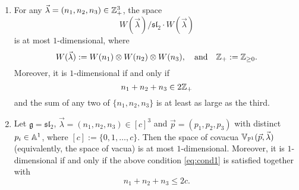 \documentclass[12pt]{article}
\begin{document}
\begin{proposition}
    \leavevmode
    \begin{enumerate}
        \item For any $\vec\lambda=(n_1,n_2,n_3)\in\Z_+^3$, the space
              \[
                  W(\vec\lambda)/\mathfrak{sl}_2\cdot W(\vec\lambda)
              \]
              is at most $1$-dimensional, where
              \[
                  W(\vec\lambda):=W(n_1)\otimes W(n_2)\otimes W(n_3),
                  \quad\text{and}\quad
                  \Z_+:=\Z_{\ge0}.
              \]
              Moreover, it is $1$-dimensional if and only if
              \begin{equation}\label{eq:cond1}
                  n_1+n_2+n_3\in2\Z_+
              \end{equation} and the sum of any two of $\{n_1,n_2,n_3\}$ is at least as large as the third.

        \item Let $\mathfrak g=\mathfrak{sl}_2$,
              $\vec\lambda=(n_1,n_2,n_3)\in[c]^3$ and
              $\vec p=(p_1,p_2,p_3)$ with distinct $p_i\in\A^1$, where
              $[c]:=\{0,1,\dots,c\}$.
              Then the space of covacua
              $\mathbb V_{\P^1}(\vec p,\vec\lambda)$
              (equivalently, the space of vacua) is at most $1$-dimensional.
              Moreover, it is $1$-dimensional if and only if the above condition
              \eqref{eq:cond1} is satisfied together with
              \begin{equation}\label{eq:cond2}
                  n_1+n_2+n_3\le2c.
              \end{equation}
    \end{enumerate}
\end{proposition}
\end{document}
